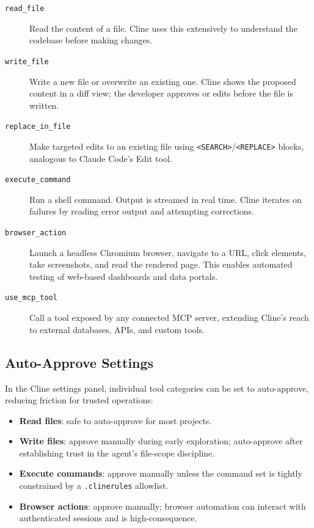 \begin{description}
  \item[\texttt{read\_file}] Read the content of a file.  Cline uses this
        extensively to understand the codebase before making changes.

  \item[\texttt{write\_file}] Write a new file or overwrite an existing one.
        Cline shows the proposed content in a diff view; the developer approves
        or edits before the file is written.

  \item[\texttt{replace\_in\_file}] Make targeted edits to an existing file
        using \texttt{<\!SEARCH\!>}/\texttt{<\!REPLACE\!>} blocks, analogous
        to Claude Code's Edit tool.

  \item[\texttt{execute\_command}] Run a shell command.  Output is streamed
        in real time.  Cline iterates on failures by reading error output and
        attempting corrections.

  \item[\texttt{browser\_action}] Launch a headless Chromium browser, navigate
        to a URL, click elements, take screenshots, and read the rendered page.
        This enables automated testing of web-based dashboards and data portals.

  \item[\texttt{use\_mcp\_tool}] Call a tool exposed by any connected MCP server,
        extending Cline's reach to external databases, APIs, and custom tools.
\end{description}

\subsection{Auto-Approve Settings}
\label{app:cline:auto-approve}

In the Cline settings panel, individual tool categories can be set to
auto-approve, reducing friction for trusted operations:

\begin{itemize}
  \item \textbf{Read files}: safe to auto-approve for most projects.
  \item \textbf{Write files}: approve manually during early exploration;
        auto-approve after establishing trust in the agent's file-scope
        discipline.
  \item \textbf{Execute commands}: approve manually unless the command set
        is tightly constrained by a \texttt{.clinerules} allowlist.
  \item \textbf{Browser actions}: approve manually; browser automation
        can interact with authenticated sessions and is high-consequence.
\end{itemize}

